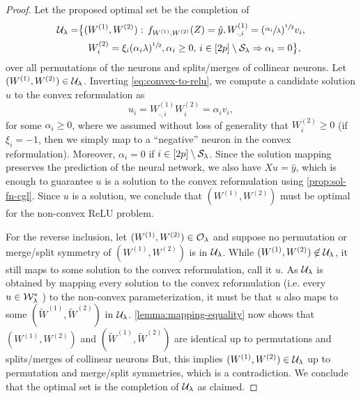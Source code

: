 \reluSolFn*
\begin{proof}
    Let the proposed optimal set be the completion of
    \[
        \begin{aligned}
            \mathcal{U}_\lambda =
             & \big\{
            (W^{(1)}, W^{(2)}) :
            \, f_{W^{(1)}, W^{(2)}}(Z) =  \hat y,
            W^{(1)}_{\cdot, i} = (\sfrac{\alpha_{i}}{\lambda})^{\sfrac{1}{2}} v_i, \\
             & \hspace{1em} W^{(2)}_{i} = \xi_i (\alpha_i \lambda)^{\sfrac{1}{2}},
            \alpha_i \geq 0, \, i \in [2p] \setminus \mathcal{S}_\lambda \Rightarrow \alpha_i = 0
            \big\},
        \end{aligned}
    \]
    over all permutations of the neurons and splits/merges of collinear
    neurons.
    Let \( (W^{(1)}, W^{(2)}) \in \mathcal{U}_\lambda \).
    Inverting \cref{eq:convex-to-relu}, we compute a candidate solution \( u \)
    to the convex reformulation as
    \[
        u_i = W^{(1)}_{\cdot, i} W^{(2)}_{i} = \alpha_{i} v_i,
    \]
    for some \( \alpha_i \geq 0 \), where we assumed without loss of generality
    that \( W^{(2)}_{i} \geq 0 \) (if \( \xi_i = -1 \), then we simply map to a
    ``negative'' neuron in the convex reformulation).
    Moreover, \( \alpha_i = 0 \) if \( i \in [2p] \setminus \mathcal{S}_\lambda \).
    Since the solution mapping preserves the prediction of the neural network,
    we also have \( X u = \hat y \), which is enough to guarantee \( u \)
    is a solution to the convex reformulation using \cref{prop:sol-fn-cgl}.
    Since \( u \) is a solution, we conclude that \( (W^{(1)}, W^{(2)}) \) must
    be optimal for the non-convex ReLU problem.

    For the reverse inclusion, let \( (W^{(1)}, W^{(2)}) \in \mathcal{O}_\lambda \) and
    suppose no permutation or merge/split symmetry of \( (W^{(1)}, W^{(2)}) \)
    is in \( \mathcal{U}_\lambda \).
    While \( (W^{(1)}, W^{(2)}) \not \in \mathcal{U}_\lambda \), it still maps to
    some solution to the convex reformulation, call it \( u \).
    As \( \mathcal{U}_\lambda \) is obtained by mapping every solution to the convex
    reformulation (i.e. every \( u \in \mathcal{W}^*_\lambda \) ) to the non-convex
    parameterization, it must be that \( u \) also maps to some
    \( (\tilde W^{(1)}, \tilde W^{(2)}) \) in \( \mathcal{U}_\lambda \).
    \cref{lemma:mapping-equality} now shows that \( (W^{(1)}, W^{(2)}) \) and
    \( (\tilde W^{(1)}, \tilde W^{(2)}) \) are identical up to permutations and
    splits/merges of collinear neurons
    But, this implies \( (W^{(1)}, W^{(2)}) \in \mathcal{U}_\lambda \) up to permutation
    and merge/split symmetries, which is a contradiction.
    We conclude that the optimal set is the completion of \( \mathcal{U}_\lambda \) as
    claimed.
\end{proof}

